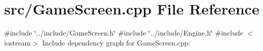 \section{src/\-Game\-Screen.cpp \-File \-Reference}
\label{_game_screen_8cpp}
{\ttfamily \#include \char`\"{}../include/\-Game\-Screen.\-h\char`\"{}}\*
{\ttfamily \#include \char`\"{}../include/\-Engine.\-h\char`\"{}}\*
{\ttfamily \#include $<$iostream$>$}\*
\-Include dependency graph for \-Game\-Screen.\-cpp\-:
